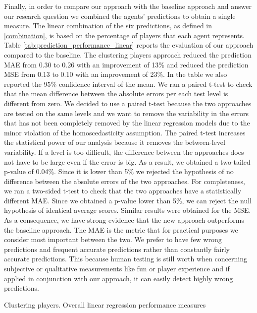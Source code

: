 Finally, in order to compare our approach with the baseline approach and answer our research question we combined the agents' predictions to obtain a single measure. The linear combination of the six predictions, as defined in \ref{combination}, is based on the percentage of players that each agent represents. Table \ref{tab:prediction_performance_linear} reports the evaluation of our approach compared to the baseline. The clustering players approach reduced the prediction MAE from 0.30 to 0.26 with an improvement of 13\% and reduced the prediction MSE from 0.13 to 0.10 with an improvement of 23\%. In the table we also reported the 95\% confidence interval of the mean. We ran a paired t-test to check that the mean difference between the absolute errors per each test level is different from zero. We decided to use a paired t-test because the two approaches are tested on the same levels and we want to remove the variability in the errors that has not been completely removed by the linear regression models due to the minor violation of the homoscedasticity assumption. The paired t-test increases the statistical power of our analysis because it removes the between-level variability. If a level is too difficult, the difference between the approaches does not have to be large even if the error is big. As a result, we obtained a two-tailed p-value of 0.04\%. Since it is lower than 5\% we rejected the hypothesis of no difference between the absolute errors of the two approaches. For completeness, we ran a two-sided t-test to check that the two approaches have a statistically different \acs{MAE}. Since we obtained a p-value lower than 5\%, we can reject the null hypothesis of identical average scores. Similar results were obtained for the \acs{MSE}. As a consequence, we have strong evidence that the new approach outperforms the baseline approach. The MAE is the metric that for practical purposes we consider most important between the two. We prefer to have few wrong predictions and frequent accurate predictions rather than constantly fairly accurate predictions. This because human testing is still worth when concerning subjective or qualitative measurements like fun or player experience and if applied in conjunction with our approach, it can easily detect highly wrong predictions.
\begin{table}[h!]
    \centering
    \small
    \caption{Clustering players. Overall linear regression performance measures} 
    
    \label{tab:prediction_performance_linear}
\end{table} 

